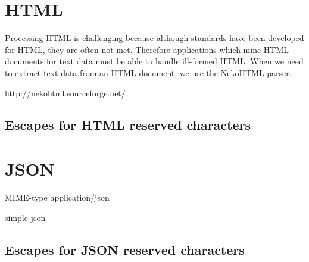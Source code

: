 \section{HTML}

Processing HTML is challenging because although standards
have been developed for HTML, they are often not met.
Therefore applications which mine HTML documents for text data
must be able to handle ill-formed HTML.
When we need to extract text data from an HTML document,
we use the NekoHTML parser.

http://nekohtml.sourceforge.net/

\subsection{Escapes for HTML reserved characters}

\section{JSON}

MIME-type application/json

simple json

\subsection{Escapes for JSON reserved characters}

